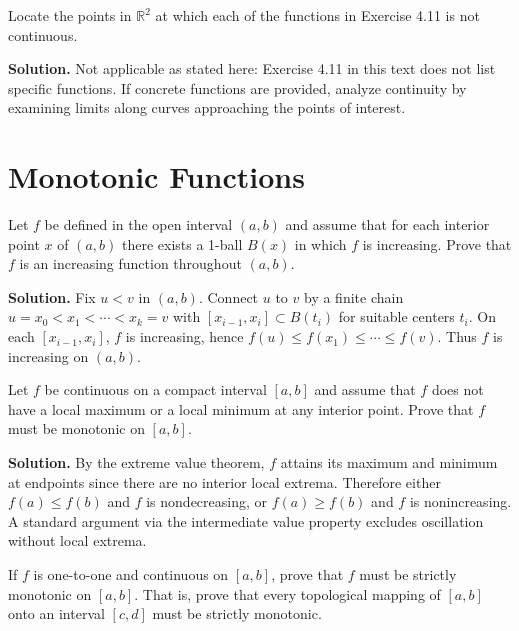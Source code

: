 \begin{problembox}
Locate the points in $\mathbb{R}^2$ at which each of the functions in Exercise 4.11 is not continuous.
\end{problembox}

\noindent\textbf{Solution.}
Not applicable as stated here: Exercise 4.11 in this text does not list specific functions. If concrete functions are provided, analyze continuity by examining limits along curves approaching the points of interest.
\medskip

\section{Monotonic Functions}

\begin{problembox}
Let $f$ be defined in the open interval $(a, b)$ and assume that for each interior point $x$ of $(a, b)$ there exists a 1-ball $B(x)$ in which $f$ is increasing. Prove that $f$ is an increasing function throughout $(a, b)$.
\end{problembox}

\noindent\textbf{Solution.}
Fix $u<v$ in $(a,b)$. Connect $u$ to $v$ by a finite chain $u=x_0<x_1<\cdots<x_k=v$ with $[x_{i-1},x_i]\subset B(t_i)$ for suitable centers $t_i$. On each $[x_{i-1},x_i]$, $f$ is increasing, hence $f(u)\le f(x_1)\le\cdots\le f(v)$. Thus $f$ is increasing on $(a,b)$.
\medskip

\begin{problembox}
Let $f$ be continuous on a compact interval $[a, b]$ and assume that $f$ does not have a local maximum or a local minimum at any interior point. Prove that $f$ must be monotonic on $[a, b]$.
\end{problembox}

\noindent\textbf{Solution.}
By the extreme value theorem, $f$ attains its maximum and minimum at endpoints since there are no interior local extrema. Therefore either $f(a)\le f(b)$ and $f$ is nondecreasing, or $f(a)\ge f(b)$ and $f$ is nonincreasing. A standard argument via the intermediate value property excludes oscillation without local extrema.
\medskip

\begin{problembox}
If $f$ is one-to-one and continuous on $[a, b]$, prove that $f$ must be strictly monotonic on $[a, b]$. That is, prove that every topological mapping of $[a, b]$ onto an interval $[c, d]$ must be strictly monotonic.
\end{problembox}

